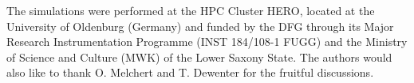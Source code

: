 The simulations were performed at the HPC Cluster HERO, located at
the University of Oldenburg (Germany) and funded by the DFG through
its Major Research Instrumentation Programme (INST 184/108-1 FUGG)
and the Ministry of Science and Culture (MWK) of the Lower Saxony
State.
The authors would also like to thank O. Melchert and T. Dewenter
for the fruitful discussions.
